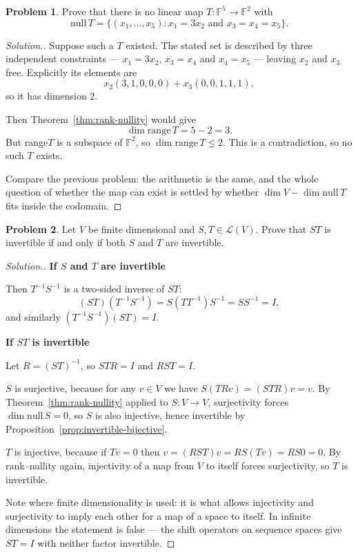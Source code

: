 \documentclass[11pt,a4paper]{article}
\theoremstyle{definition}
\newtheorem{problemx}{Problem}[section]
\newenvironment{problem}{\begin{problemx}}{\end{problemx}}
\newenvironment{solution}
  {\renewcommand{\qedsymbol}{}\begin{proof}[\textit{Solution}.]}
  {\end{proof}}
\newcommand{\subhead}[1]{%
  \par\medskip\noindent\textbf{#1}\par\nobreak\smallskip}
\begin{document}
\begin{problem}
Prove that there is no linear map $T:\mathbb{F}^5\rightarrow\mathbb{F}^2$ with
$$\text{null}\,T=\{(x_1,\dots,x_5): x_1=3x_2 \text{ and } x_3=x_4=x_5\}.$$
\end{problem}
\begin{solution}
Suppose such a $T$ existed. The stated set is described by three independent
constraints --- $x_1=3x_2$, $x_3=x_4$ and $x_4=x_5$ --- leaving $x_2$ and $x_3$
free. Explicitly its elements are
$$x_2(3,1,0,0,0)+x_3(0,0,1,1,1),$$
so it has dimension $2$.

Then Theorem~\ref{thm:rank-nullity} would give
$$\dim\text{range}\,T=5-2=3.$$
But range$T$ is a subspace of $\mathbb{F}^2$, so $\dim\text{range}\,T\leq 2$.
This is a contradiction, so no such $T$ exists.

Compare the previous problem: the arithmetic is the same, and the whole
question of whether the map can exist is settled by whether $\dim V-\dim
\text{null}\,T$ fits inside the codomain.
\end{solution}

\begin{problem}
Let $V$ be finite dimensional and $S,T\in\mathcal{L}(V)$. Prove that $ST$ is
invertible if and only if both $S$ and $T$ are invertible.
\end{problem}
\begin{solution}
\subhead{If $S$ and $T$ are invertible}
Then $T^{-1}S^{-1}$ is a two-sided inverse of $ST$:
$$(ST)(T^{-1}S^{-1})=S(TT^{-1})S^{-1}=SS^{-1}=I,$$
and similarly $(T^{-1}S^{-1})(ST)=I$.

\subhead{If $ST$ is invertible}
Let $R=(ST)^{-1}$, so $STR=I$ and $RST=I$.

$S$ is surjective, because for any $v\in V$ we have $S(TRv)=(STR)v=v$. By
Theorem~\ref{thm:rank-nullity} applied to $S:V\to V$, surjectivity forces
$\dim\text{null}\,S=0$, so $S$ is also injective, hence invertible by
Proposition~\ref{prop:invertible-bijective}.

$T$ is injective, because if $Tv=0$ then $v=(RST)v=RS(Tv)=RS0=0$. By
rank--nullity again, injectivity of a map from $V$ to itself forces
surjectivity, so $T$ is invertible.

Note where finite dimensionality is used: it is what allows injectivity and
surjectivity to imply each other for a map of a space to itself. In infinite
dimensions the statement is false --- the shift operators on sequence spaces
give $ST=I$ with neither factor invertible.
\end{solution}
\end{document}
